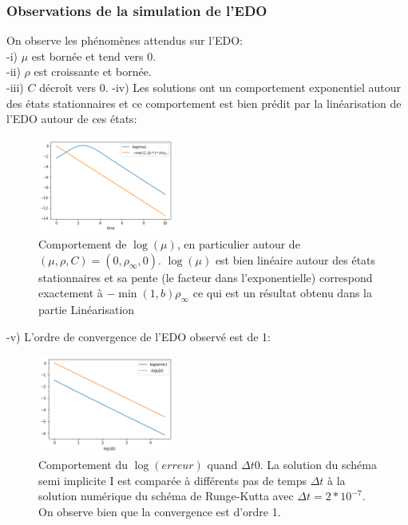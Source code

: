 \documentclass[11pt]{article}
\begin{document}
\subsubsection{Observations de la simulation de l'EDO}
 On observe les phénomènes attendus sur l'EDO:\\
 -i) $\mu$ est bornée et tend vers 0.\\
 -ii) $\rho$ est croissante et bornée.\\
 -iii) $C$ décroît vers 0.
 \newpage
 -iv) Les solutions ont un comportement exponentiel autour des états stationnaires et ce comportement est bien prédit par la linéarisation de l'EDO autour de ces états:

\begin{figure}
\includegraphics[width=0.4\textwidth]{Images/linearisation.png}
\caption{Comportement de $\log(\mu)$, en particulier autour de $(\mu,\rho,C) =  (0,\rho_\infty,0)$. $\log(\mu)$ est bien linéaire autour des états stationnaires et sa pente (le facteur dans l'exponentielle) correspond exactement à $-\min(1,b)\rho_\infty$ ce qui est un résultat obtenu dans la partie Linéarisation } 
\end{figure} 
 
 -v) L'ordre de convergence de l'EDO observé est de 1:
\begin{figure}
\includegraphics[width=0.4\textwidth]{Images/ordrecvedo.png}
\caption{Comportement du $\log(erreur)$ quand $\Delta t   0$. La solution du schéma semi implicite I est comparée à différents pas de temps $\Delta t$ à la solution numérique du schéma de Runge-Kutta avec $\Delta t = 2*10^{-7}$. On observe bien que la convergence est d'ordre 1.}
\end{figure} 
\end{document}
